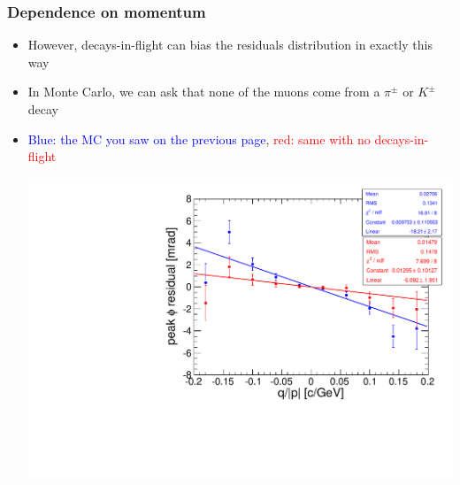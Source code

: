 \documentclass[compress]{beamer}
\begin{document}
\begin{frame}
\frametitle{Dependence on momentum}
\begin{itemize}
\item However, decays-in-flight can bias the residuals distribution in exactly this way
\item In Monte Carlo, we can ask that none of the muons come from a
  $\pi^\pm$ or $K^\pm$ decay
\item \textcolor{blue}{Blue: the MC you saw on the previous page},
  \textcolor{red}{red: same with no decays-in-flight}

\begin{center}
\includegraphics[width=0.5\linewidth]{nocuts_decayinflight.pdf}
\end{center}
\end{itemize}
\end{frame}
\end{document}
